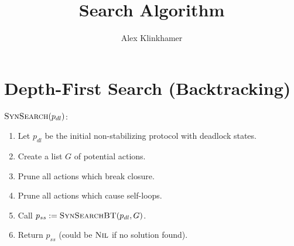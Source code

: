 

\usepackage{verbatim}


\title{Search Algorithm}
\author{Alex Klinkhamer}
\maketitle

\section{Depth-First Search (Backtracking)}

$\text{\normalfont\scshape SynSearch}(p_{dl})$:
\begin{enumerate}
 \item Let $p_{dl}$ be the initial non-stabilizing protocol with deadlock states.
 \item Create a list $G$ of potential actions.
 \item Prune all actions which break closure.
 \item Prune all actions which cause self-loops.
 \item Call $p_{ss} := \text{\normalfont\scshape SynSearchBT}(p_{dl}, G)$.
 \item Return $p_{ss}$ (could be $\text{\normalfont\scshape Nil}$ if no solution found).
\end{enumerate}

